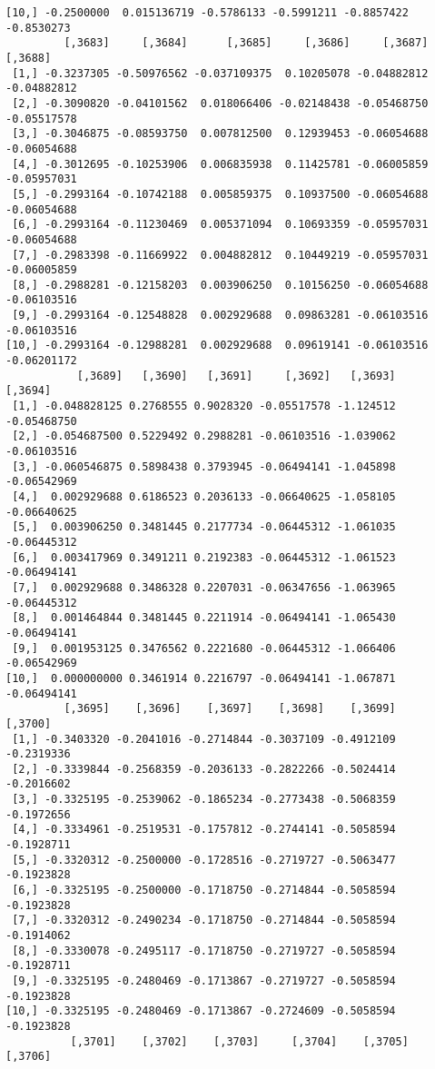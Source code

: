 \documentclass[
  letterpaper,
  DIV=11,
  numbers=noendperiod]{scrreprt}
\begin{document}
\begin{verbatim}
[10,] -0.2500000  0.015136719 -0.5786133 -0.5991211 -0.8857422 -0.8530273
         [,3683]     [,3684]      [,3685]     [,3686]     [,3687]     [,3688]
 [1,] -0.3237305 -0.50976562 -0.037109375  0.10205078 -0.04882812 -0.04882812
 [2,] -0.3090820 -0.04101562  0.018066406 -0.02148438 -0.05468750 -0.05517578
 [3,] -0.3046875 -0.08593750  0.007812500  0.12939453 -0.06054688 -0.06054688
 [4,] -0.3012695 -0.10253906  0.006835938  0.11425781 -0.06005859 -0.05957031
 [5,] -0.2993164 -0.10742188  0.005859375  0.10937500 -0.06054688 -0.06054688
 [6,] -0.2993164 -0.11230469  0.005371094  0.10693359 -0.05957031 -0.06054688
 [7,] -0.2983398 -0.11669922  0.004882812  0.10449219 -0.05957031 -0.06005859
 [8,] -0.2988281 -0.12158203  0.003906250  0.10156250 -0.06054688 -0.06103516
 [9,] -0.2993164 -0.12548828  0.002929688  0.09863281 -0.06103516 -0.06103516
[10,] -0.2993164 -0.12988281  0.002929688  0.09619141 -0.06103516 -0.06201172
           [,3689]   [,3690]   [,3691]     [,3692]   [,3693]     [,3694]
 [1,] -0.048828125 0.2768555 0.9028320 -0.05517578 -1.124512 -0.05468750
 [2,] -0.054687500 0.5229492 0.2988281 -0.06103516 -1.039062 -0.06103516
 [3,] -0.060546875 0.5898438 0.3793945 -0.06494141 -1.045898 -0.06542969
 [4,]  0.002929688 0.6186523 0.2036133 -0.06640625 -1.058105 -0.06640625
 [5,]  0.003906250 0.3481445 0.2177734 -0.06445312 -1.061035 -0.06445312
 [6,]  0.003417969 0.3491211 0.2192383 -0.06445312 -1.061523 -0.06494141
 [7,]  0.002929688 0.3486328 0.2207031 -0.06347656 -1.063965 -0.06445312
 [8,]  0.001464844 0.3481445 0.2211914 -0.06494141 -1.065430 -0.06494141
 [9,]  0.001953125 0.3476562 0.2221680 -0.06445312 -1.066406 -0.06542969
[10,]  0.000000000 0.3461914 0.2216797 -0.06494141 -1.067871 -0.06494141
         [,3695]    [,3696]    [,3697]    [,3698]    [,3699]    [,3700]
 [1,] -0.3403320 -0.2041016 -0.2714844 -0.3037109 -0.4912109 -0.2319336
 [2,] -0.3339844 -0.2568359 -0.2036133 -0.2822266 -0.5024414 -0.2016602
 [3,] -0.3325195 -0.2539062 -0.1865234 -0.2773438 -0.5068359 -0.1972656
 [4,] -0.3334961 -0.2519531 -0.1757812 -0.2744141 -0.5058594 -0.1928711
 [5,] -0.3320312 -0.2500000 -0.1728516 -0.2719727 -0.5063477 -0.1923828
 [6,] -0.3325195 -0.2500000 -0.1718750 -0.2714844 -0.5058594 -0.1923828
 [7,] -0.3320312 -0.2490234 -0.1718750 -0.2714844 -0.5058594 -0.1914062
 [8,] -0.3330078 -0.2495117 -0.1718750 -0.2719727 -0.5058594 -0.1928711
 [9,] -0.3325195 -0.2480469 -0.1713867 -0.2719727 -0.5058594 -0.1923828
[10,] -0.3325195 -0.2480469 -0.1713867 -0.2724609 -0.5058594 -0.1923828
          [,3701]    [,3702]    [,3703]     [,3704]    [,3705]    [,3706]

\end{verbatim}
\end{document}

